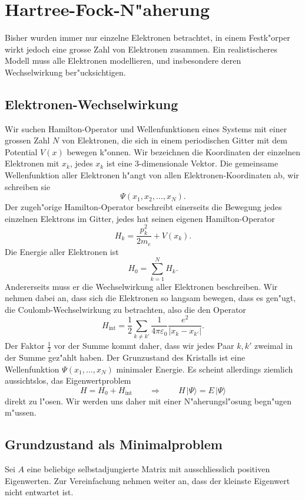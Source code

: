 \section{Hartree-Fock-N"aherung\label{section:hartree-fock}}
Bisher wurden immer nur einzelne Elektronen betrachtet, in einem 
Festk"orper wirkt jedoch eine grosse Zahl von Elektronen zusammen.
Ein realistischeres Modell muss alle Elektronen modellieren, und
insbesondere deren Wechselwirkung ber"ucksichtigen.

\subsection{Elektronen-Wechselwirkung}
Wir suchen Hamilton-Operator und Wellenfunktionen eines Systems mit einer
grossen Zahl $N$ von Elektronen, die sich in einem periodischen Gitter mit dem
Potential $V(x)$ bewegen k"onnen.
Wir bezeichnen die Koordinaten der einzelnen Elektronen mit $x_k$, jedes
$x_k$ ist eine 3-dimensionale Vektor.
Die gemeinsame Wellenfunktion aller Elektronen h"angt von allen
Elektronen-Koordinaten ab, wir schreiben sie
\[
\Psi(x_1,x_2,\dots,x_N).
\]
Der zugeh"orige Hamilton-Operator beschreibt einerseits die Bewegung
jedes einzelnen Elektrons im Gitter, jedes hat seinen eigenen
Hamilton-Operator
\[
H_k=\frac{p_k^2}{2m_e}+V(x_k).
\]
Die Energie aller Elektronen ist
\[
H_0= \sum_{k=1}^N H_k.
\]
Andererseits muss er die Wechselwirkung aller Elektronen beschreiben.
Wir nehmen dabei an, dass sich die Elektronen so langsam bewegen, dass
es gen"ugt, die Coulomb-Wechselwirkung zu betrachten, also die den
Operator
\[
H_{\text{int}}
=
\frac12\sum_{k\ne k'}\frac{1}{4\pi\varepsilon_0}\frac{e^2}{|x_k-x_{k'}|}.
\]
Der Faktor $\frac12$ vor der Summe kommt daher, dass wir jedes Paar
$k,k'$ zweimal in der Summe gez"ahlt haben.
Der Grunzustand des Kristalls ist eine Wellenfunktion $\Psi(x_1,\dots,x_N)$
minimaler Energie.
Es scheint allerdings ziemlich aussichtslos, das Eigenwertproblem
\begin{equation}
H=H_0+H_{\text{int}}
\qquad \Rightarrow\qquad
H\,|\Psi\rangle = E\,|\Psi\rangle
\label{skript:multielektronewproblem}
\end{equation}
direkt zu l"osen. Wir werden uns daher mit einer N"aherungsl"osung 
begn"ugen m"ussen.

\subsection{Grundzustand als Minimalproblem}
Sei $A$ eine beliebige selbstadjungierte Matrix mit ausschliesslich
positiven Eigenwerten.
Zur Vereinfachung nehmen weiter an, dass der kleinste Eigenwert nicht 
entwartet ist.

